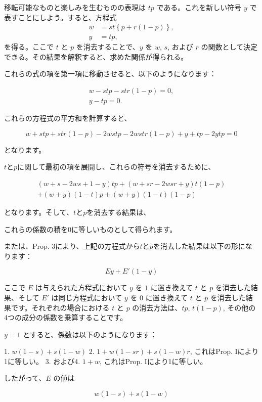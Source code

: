 \documentclass[a4paper,11pt,openany]{ltjsbook}
\begin{document}
移転可能なものと楽しみを生むものの表現は $tp$ である。これを新しい符号 $y$ で表すことにしよう。すると、方程式
\begin{eqnarray*}
w &= st \left\{p + r\left(1 - p\right)\right\},\\
y &= tp,
\end{eqnarray*}
を得る。ここで $t$ と $p$ を消去することで、$y$ を $w$, $s$, および $r$ の関数として決定できる。その結果を解釈すると、求めた関係が得られる。

これらの式の項を第一項に移動させると、以下のようになります：

\begin{eqnarray}
w - stp - str (1 - p) = 0, \nonumber \\
y - tp = 0.
\end{eqnarray}

これらの方程式の平方和を計算すると、

\begin{equation}
w + stp + str (1-p) - 2wstp - 2wstr(1-p) + y + tp - 2ytp = 0
\end{equation}

となります。

$t$と$p$に関して最初の項を展開し、これらの符号を消去するために、

\begin{eqnarray}
(w+s-2ws+1-y)tp + (w+sr-2wsr+y)t(1-p) \nonumber \\
+(w+y)(1-t)p + (w+y)(1-t)(1-p)
\end{eqnarray}

となります。そして、$t$と$p$を消去する結果は、

これらの係数の積を0に等しいものとして得られます。

または、Prop. 3により、上記の方程式から$t$と$p$を消去した結果は以下の形になります：

\[
Ey + E'(1-y)
\]

ここで $E$ は与えられた方程式において $y$ を $1$ に置き換えて $t$ と $p$ を消去した結果、そして $E'$ は同じ方程式において $y$ を $0$ に置き換えて $t$ と $p$ を消去した結果です。それぞれの場合における $t$ と $p$ の消去方法は、$tp$, $t(1-p)$, その他の4つの成分の係数を乗算することです。

$y = 1$ とすると、係数は以下のようになります：

1. $w(1-s) + s(1-w)$
2. $1 + w(1-sr) + s(1-w)r$, これはProp. Iにより1に等しい。
3. および4. $1 + w$, これはProp. Iにより1に等しい。

したがって、$E$ の値は

\[
w(1-s) + s(1-w)
\]
\end{document}
